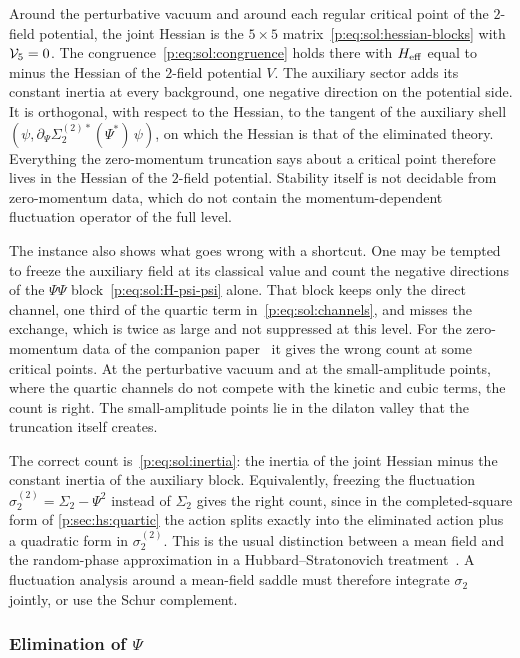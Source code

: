 Around the perturbative vacuum and around each regular critical point of the $2$-field potential, the joint Hessian is the $5 \times 5$ matrix~\eqref{p:eq:sol:hessian-blocks} with $\mathcal{V}_{5} = 0$.
The congruence~\eqref{p:eq:sol:congruence} holds there with $H_{\rm eff}$ equal to minus the Hessian of the $2$-field potential $V$.
The auxiliary sector adds its constant inertia at every background, one negative direction on the potential side.
It is orthogonal, with respect to the Hessian, to the tangent of the auxiliary shell $(\psi, \partial_\Psi \Sigma_2^{(2)*}(\Psi^*) \, \psi)$, on which the Hessian is that of the eliminated theory.
Everything the zero-momentum truncation says about a critical point therefore lives in the Hessian of the $2$-field potential.
Stability itself is not decidable from zero-momentum data, which do not contain the momentum-dependent fluctuation operator of the full level.

The instance also shows what goes wrong with a shortcut.
One may be tempted to freeze the auxiliary field at its classical value and count the negative directions of the $\Psi \Psi$ block~\eqref{p:eq:sol:H-psi-psi} alone.
That block keeps only the direct channel, one third of the quartic term in~\eqref{p:eq:sol:channels}, and misses the exchange, which is twice as large and not suppressed at this level.
For the zero-momentum data of the companion paper~\cite{Erbin:2026:SL2CVerticesClosed} it gives the wrong count at some critical points.
At the perturbative vacuum and at the small-amplitude points, where the quartic channels do not compete with the kinetic and cubic terms, the count is right.
The small-amplitude points lie in the dilaton valley that the truncation itself creates.

The correct count is~\eqref{p:eq:sol:inertia}: the inertia of the joint Hessian minus the constant inertia of the auxiliary block.
Equivalently, freezing the fluctuation $\sigma_2^{(2)} = \Sigma_2 - \Psi^2$ instead of $\Sigma_2$ gives the right count, since in the completed-square form of \cref{p:sec:hs:quartic} the action splits exactly into the eliminated action plus a quadratic form in $\sigma_2^{(2)}$.
This is the usual distinction between a mean field and the random-phase approximation in a Hubbard--Stratonovich treatment~\cite{Negele:1988:QuantumManyParticleSystems}.
A fluctuation analysis around a mean-field saddle must therefore integrate $\sigma_2$ jointly, or use the Schur complement.

\subsubsection{Elimination of \texorpdfstring{$\Psi$}{Psi}}
\label{p:sec:sol:psi-elimination}

